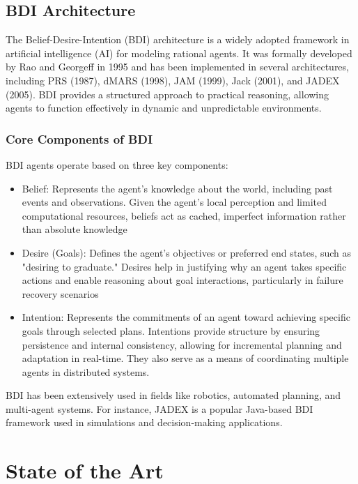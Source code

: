 \subsection{BDI Architecture}
\label{sub:bdi_architecture}

The Belief-Desire-Intention (BDI) architecture is a widely adopted framework in artificial
intelligence (AI) for modeling rational agents. It was formally developed by Rao
and Georgeff in 1995 \cite{bdi-icmas95} and has been implemented in several
architectures, including PRS (1987), dMARS (1998), JAM (1999), Jack (2001), and JADEX
(2005). BDI provides a structured approach to practical reasoning, allowing agents
to function effectively in dynamic and unpredictable environments.

\subsubsection{Core Components of BDI}
BDI agents operate based on three key components:
\begin{itemize}
  \item Belief: Represents the agent’s knowledge about the world, including past
    events and observations. Given the agent's local perception and limited
    computational resources, beliefs act as cached, imperfect information rather
    than absolute knowledge

  \item Desire (Goals): Defines the agent’s objectives or preferred end states, such
    as "desiring to graduate." Desires help in justifying why an agent takes
    specific actions and enable reasoning about goal interactions, particularly in
    failure recovery scenarios

  \item Intention: Represents the commitments of an agent toward achieving
    specific goals through selected plans. Intentions provide structure by ensuring
    persistence and internal consistency, allowing for incremental planning and
    adaptation in real-time. They also serve as a means of coordinating multiple
    agents in distributed systems.
\end{itemize}

BDI has been extensively used in fields like robotics, automated planning, and multi-agent
systems. For instance, JADEX is a popular Java-based BDI framework used in simulations
and decision-making applications.

\section{State of the Art}
\label{sec:state_of_the_art}

